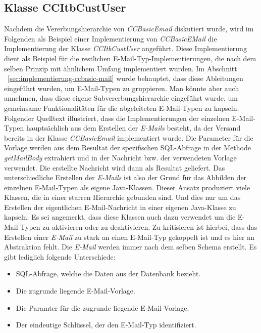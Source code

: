 \subsection{Klasse CCItbCustUser}
Nachdem die Vererbungshierarchie von \emph{CCBasicEmail} diskutiert wurde, wird im Folgenden als Beispiel einer Implementierung von \emph{CCBasicEMail} die Implementierung der Klasse \emph{CCItbCustUser} angeführt. Diese Implementierung dient als Beispiel für die restlichen E-Mail-Typ-Implementierungen, die nach dem selben Prinzip mit ähnlichem Umfang implementiert wurden. Im Abschnitt ~\ref{sec:implementierung-ccbasic-mail} wurde behauptet, dass diese Ableitungen eingeführt wurden, um E-Mail-Typen zu gruppieren. Man könnte aber auch annehmen, dass diese eigene Subvererbungshierarchie eingeführt wurde, um gemeinsame Funktionalitäten für die abgeleiteten E-Mail-Typen zu kapseln. 
\newline
\newline
Folgender Quelltext illustriert, dass die Implementierungen der einzelnen E-Mail-Typen hauptsächlich aus dem Erstellen der \emph{E-Mails} besteht, da der Versand bereits in der Klasse \emph{CCBasicEmail} implementiert wurde. Die Parameter für die Vorlage werden aus dem Resultat der spezifischen SQL-Abfrage in der Methode \emph{getMailBody} extrahiert und in der Nachricht bzw. der verwendeten Vorlage verwendet. Die erstellte Nachricht wird dann als Resultat geliefert. Das unterschiedliche Erstellen der \emph{E-Mails} ist also der Grund für das Abbilden der einzelnen E-Mail-Typen als eigene Java-Klassen. Dieser Ansatz produziert viele Klassen, die in einer starren Hierarchie gebunden sind. Und dies nur um das Erstellen der eigentlichen E-Mail-Nachricht in einer eigenen Java-Klasse zu kapseln. Es sei angemerkt, dass diese Klassen auch dazu verwendet um die E-Mail-Typen zu aktivieren oder zu deaktivieren. Zu kritisieren ist hierbei, dass das Erstellen einer \emph{E-Mail} zu stark an einen E-Mail-Typ gekoppelt ist und es hier an Abstraktion fehlt. Die \emph{E-Mail} werden immer nach dem selben Schema erstellt. Es gibt lediglich folgende Unterschiede:
\begin{itemize}
	\item SQL-Abfrage, welche die Daten aus der Datenbank bezieht.
	\item Die zugrunde liegende E-Mail-Vorlage.
	\item Die Paramter für die zugrunde liegende E-Mail-Vorlage.
	\item Der eindeutige Schlüssel, der den E-Mail-Typ identifiziert.
\end{itemize}
